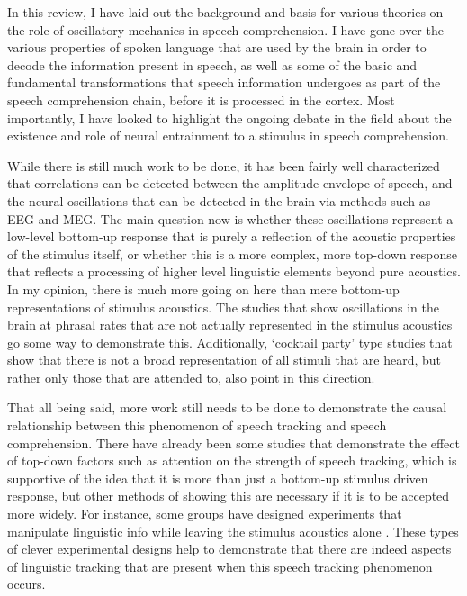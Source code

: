 \documentclass[titlepage]{article}
\begin{document}
    In this review, I have laid out the background and basis for 
    various theories on the role of oscillatory mechanics in speech 
    comprehension. I have gone over the various properties of spoken language 
    that are used by the brain in order to decode the information present in 
    speech, as well as some of the basic and fundamental transformations that 
    speech information undergoes as part of the speech comprehension chain, 
    before it is processed in the cortex. 
    Most importantly, I have looked to highlight the ongoing debate in the field about 
    the existence and role of neural entrainment to a stimulus in speech 
    comprehension.

    While there is still much work to be done, it has been fairly well 
    characterized that correlations can be detected between the amplitude envelope
    of speech, and the neural oscillations that can be detected in the brain 
    via methods such as EEG and MEG. The main question now is whether these 
    oscillations represent a low-level bottom-up response that is purely a 
    reflection of the acoustic properties of the stimulus itself, or whether 
    this is a more complex, more top-down response that reflects a processing 
    of higher level linguistic elements beyond pure acoustics. In my opinion, 
    there is much more going on here than mere bottom-up representations of 
    stimulus acoustics. The studies that show oscillations in the brain at 
    phrasal rates that are not actually represented in the stimulus acoustics 
    go some way to demonstrate this. Additionally, `cocktail party' type studies
    that show that there is not a broad representation of all stimuli that are 
    heard, but rather only those that are attended to, also point in this 
    direction.

    That all being said, more work still needs to be done to demonstrate the 
    causal relationship between this phenomenon of speech tracking and speech 
    comprehension. There have already been some studies that demonstrate the 
    effect of top-down factors such as attention on the strength of speech 
    tracking, which is supportive of the idea that it is more than just
    a bottom-up stimulus driven response, but other methods of showing this are 
    necessary if it is to be accepted more widely. For instance, some groups 
    have designed experiments that manipulate linguistic info while 
    leaving the stimulus acoustics alone \cite{Ding2015,Kayser2015}. These 
    types of clever experimental designs help to demonstrate that there are 
    indeed aspects of linguistic tracking that are present when this speech tracking 
    phenomenon occurs. 
\end{document}
